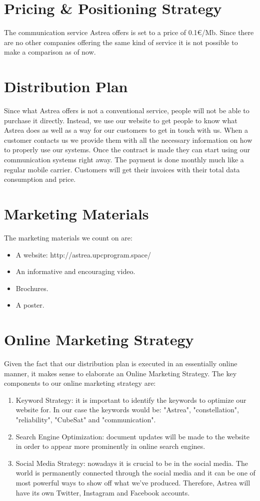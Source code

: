 \section{Pricing \& Positioning Strategy}
The communication service Astrea offers is set to a price of 0.1\euro /Mb. Since there are no other companies offering the same kind of service it is not possible to make a comparison as of now. 

\section{Distribution Plan}
Since what Astrea offers is not a conventional service, people will not be able to purchase it directly. Instead, we use our website to get people to know what Astrea does as well as a way for our customers to get in touch with us. When a customer contacts us we provide them with all the necessary information on how to properly use our systems. Once the contract is made they can start using our communication systems right away. The payment is done monthly much like a regular mobile carrier. Customers will get their invoices with their total data consumption and price.

\section{Marketing Materials}
The marketing materials we count on are:

\begin{itemize}
\item A website: http://astrea.upcprogram.space/
\item An informative and encouraging video.
\item Brochures.
\item A poster.
\end{itemize}

\section{Online Marketing Strategy}
Given the fact that our distribution plan is executed in an essentially online manner, it makes sense to elaborate an Online Marketing Strategy. The key components to our online marketing strategy are:

\begin{enumerate}
\item Keyword Strategy: it is important to identify the keywords to optimize our website for. In our case the keywords would be: "Astrea", "constellation", "reliability", "CubeSat" and "communication".
\item Search Engine Optimization: document updates will be made to the website in order to appear more prominently in online search engines.
\item Social Media Strategy: nowadays it is crucial to be in the social media. The world is permanently connected through the social media and it can be one of most powerful ways to show off what we've produced. Therefore, Astrea will have its own Twitter, Instagram and Facebook accounts.
\end{enumerate}

